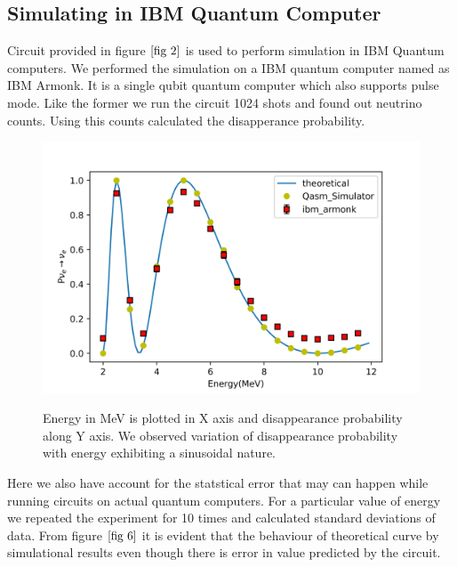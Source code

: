 \documentclass[12pt,a4paper]{report}
\begin{document}
\subsection{Simulating in IBM Quantum Computer}
Circuit provided in figure $\ref*{fig 2}$ is used to perform simulation in IBM Quantum computers. We performed the simulation on a IBM quantum computer named as IBM Armonk. It is a single qubit quantum computer which also supports pulse mode. Like the former we run the circuit 1024 shots and found out neutrino counts. Using this counts calculated the disapperance probability. 
\begin{figure}[H]
	\graphicspath{ {./Images/} }
	\centering	
	{\includegraphics[width=\textwidth]{fig_6.png}}
	\caption{Energy in MeV is plotted in X axis and disappearance probability along Y axis. We observed variation of disappearance probability with energy exhibiting a sinusoidal nature.}
	\label{fig 6}
\end{figure}\par
Here we also have account for the statstical error that may can happen while running circuits on actual quantum computers. For a particular value of energy we repeated the experiment for 10 times and calculated standard deviations of data. From figure $\ref*{fig 6}$ it is evident that the behaviour of theoretical curve by simulational results even though there is error in value predicted by the circuit.
\end{document}
